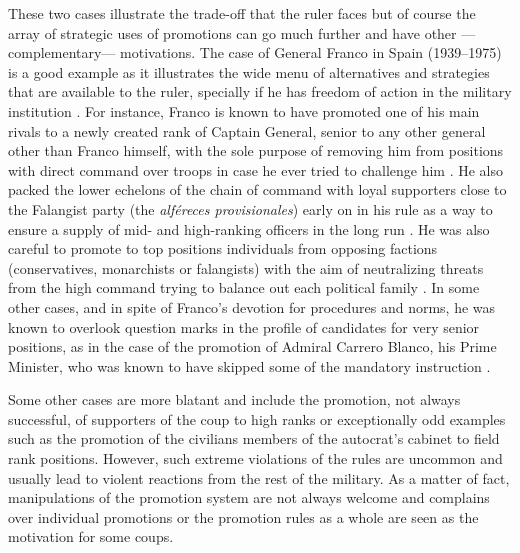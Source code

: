 These two cases illustrate the trade-off that the ruler faces but of course the
array of strategic uses of promotions can go much further and have other
---complementary--- motivations. The case of General Franco in Spain
(1939--1975) is a good example as it illustrates the wide menu of alternatives
and strategies that are available to the ruler, specially if he has freedom of
action in the military institution \citep{baquer:2005}. For instance, Franco is
known to have promoted one of his main rivals to a newly created rank of Captain
General, senior to any other general other than Franco himself, with the sole
purpose of removing him from positions with direct command over troops in case
he ever tried to challenge him \citep{baquer:2005}. He also packed the lower
echelons of the chain of command with loyal supporters close to the Falangist
party (the \emph{alf\'ereces provisionales}) early on in his rule as a way to
ensure a supply of mid- and high-ranking officers in the long run
\citep{busquets:1993}. He was also careful to promote to top positions
individuals from opposing factions (conservatives, monarchists or falangists)
with the aim of neutralizing threats from the high command trying to balance out
each political family \citep{busquets:1993}. In some other cases, and in spite
of Franco's devotion for procedures and norms, he was known to overlook question
marks in the profile of candidates for very senior positions, as in the case of
the promotion of Admiral Carrero Blanco, his Prime Minister, who was known to
have skipped some of the mandatory instruction \citep{medina:2004}.

Some other cases are more blatant and include the promotion, not always
successful, of supporters of the coup to high ranks or exceptionally odd
examples such as the promotion of the civilians members of the autocrat's
cabinet to field rank positions. However, such extreme violations of the rules
are uncommon and usually lead to violent reactions from the rest of the
military. As a matter of fact, manipulations of the promotion system are not
always welcome and complains over individual promotions or the promotion rules
as a whole are seen as the motivation for some coups.


